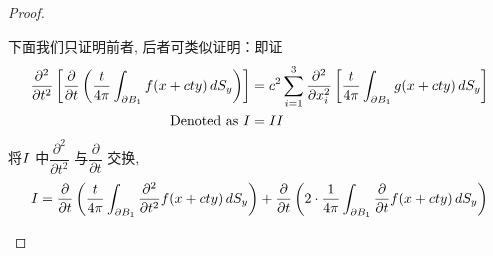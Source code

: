 \begin{thm}
\begin{proof}
\begin{enumerate}
\begin{enumerate}
					下面我们只证明前者, 后者可类似证明：即证
					\begin{align*}
						\frac{\partial^2}{\partial t^2} \left[ \frac{\partial}{\partial t}\left( \frac{t}{4\pi} \int_{\partial B_1} f(x + cty) \, dS_y \right) \right] 
						&= c^2 \sum_{i = 1}^3 \frac{\partial^2}{\partial x_{i}^2} \left[ \dfrac{t}{4\pi} \int_{\partial B_1} g(x + cty) \, dS_y \right] \\
						\text{Denoted as} \,\, \MakeUppercase{\rmnum{1}} &= \MakeUppercase{\rmnum{2}}
					\end{align*}
					将$\Rmnum{1}$ 中$\dfrac{\partial^2}{\partial t^2}$ 与$\dfrac{\partial}{\partial t}$ 交换, 
					\begin{align*}
						\Rmnum{1} 
						= \frac{\partial}{\partial t} \left( \frac{t}{4\pi} \int_{\partial B_1} \frac{\partial^2}{\partial t^2} f(x + cty) \, dS_y \right) 
						+ \frac{\partial}{\partial t} \left( 2 \cdot \frac{1}{4\pi} \int_{\partial B_1} \frac{\partial}{\partial t} f(x + cty) \, dS_y  \right)
					\end{align*}
					
					\newpage
					

\end{enumerate}
\end{enumerate}
\end{proof}
\end{thm}

